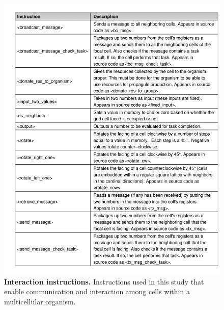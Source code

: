 \documentclass[
]{book}
\begin{document}
\begin{figure}
\centering
\includegraphics{images/Avida_instructions_Interaction_Table.png}
\caption{\label{fig:Avida-instructions-Interaction-Table}\textbf{Interaction instructions.} Instructions used in this study that enable communication and interaction among cells within a multicellular organism.}
\end{figure}
\end{document}
